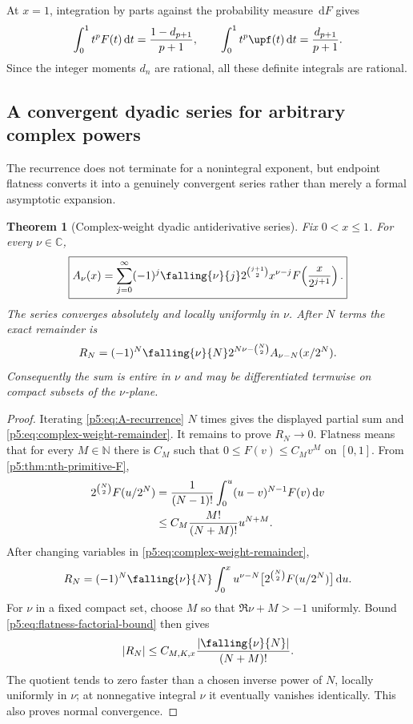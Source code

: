 \documentclass[11pt,oneside]{article}
\newtheorem{theorem}{Theorem}[section]
\theoremstyle{definition}
\theoremstyle{remark}
\newcommand{\C}{\mathbb C}
\newcommand{\N}{\mathbb N}
\newcommand{\dd}{\,\mathrm d}
\newcommand{\1}{\mathbf 1}
\begin{document}
\begin{remark}
At $x=1$, integration by parts against the probability measure $\dd F$ gives
\begin{equation}\label{p5:eq:integer-definite-moment}
 \int_0^1t^pF(t)\dd t=\frac{1-d_{p+1}}{p+1},
 \qquad
 \int_0^1t^p\upf(t)\dd t=\frac{d_{p+1}}{p+1}.
\end{equation}
Since the integer moments $d_n$ are rational, all these definite integrals are rational.
\end{remark}

\subsection{A convergent dyadic series for arbitrary complex powers}

The recurrence does not terminate for a nonintegral exponent, but endpoint flatness converts it into a genuinely convergent series rather than merely a formal asymptotic expansion.

\begin{theorem}[Complex-weight dyadic antiderivative series]\label{p5:thm:complex-weight-series}
Fix $0<x\le1$.  For every $\nu\in\C$,
\begin{equation}\label{p5:eq:complex-weight-series}
\boxed{
 A_\nu(x)=
 \sum_{j=0}^{\infty}(-1)^j\falling{\nu}{j}
 2^{\binom{j+1}{2}}x^{\nu-j}
 F\!\left(\frac{x}{2^{j+1}}\right).}
\end{equation}
The series converges absolutely and locally uniformly in $\nu$.  After $N$ terms the exact remainder is
\begin{equation}\label{p5:eq:complex-weight-remainder}
 R_N=(-1)^N\falling{\nu}{N}
 2^{N\nu-\binom N2}A_{\nu-N}(x/2^N).
\end{equation}
Consequently the sum is entire in $\nu$ and may be differentiated termwise on compact subsets of the $\nu$-plane.
\end{theorem}

\begin{proof}
Iterating \eqref{p5:eq:A-recurrence} $N$ times gives the displayed partial sum and \eqref{p5:eq:complex-weight-remainder}.  It remains to prove $R_N\to0$.  Flatness means that for every $M\in\N$ there is $C_M$ such that $0\le F(v)\le C_Mv^M$ on $[0,1]$.  From \cref{p5:thm:nth-primitive-F},
\begin{align}
 2^{\binom N2}F(u/2^N)
 &=\frac1{(N-1)!}\int_0^u(u-v)^{N-1}F(v)\dd v\notag\\
 &\le C_M\frac{M!}{(N+M)!}u^{N+M}.\label{p5:eq:flatness-factorial-bound}
\end{align}
After changing variables in \eqref{p5:eq:complex-weight-remainder},
\[
 R_N=(-1)^N\falling{\nu}{N}
 \int_0^x u^{\nu-N}
 \bigl[2^{\binom N2}F(u/2^N)\bigr]\dd u.
\]
For $\nu$ in a fixed compact set, choose $M$ so that $\Re\nu+M>-1$ uniformly.  Bound \eqref{p5:eq:flatness-factorial-bound} then gives
\[
 |R_N|\le C_{M,K,x}\frac{|\falling{\nu}{N}|}{(N+M)!}.
\]
The quotient tends to zero faster than a chosen inverse power of $N$, locally uniformly in $\nu$; at nonnegative integral $\nu$ it eventually vanishes identically.  This also proves normal convergence.
\end{proof}
\end{document}
